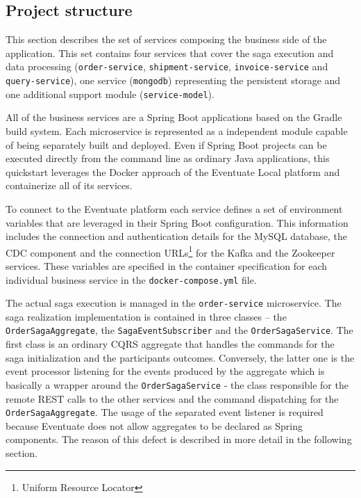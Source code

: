 \documentclass[oneside,
  digital, %
  table,   %
  nolof,     %
  nolot,     %
]{fithesis3}
\begin{document}
\subsection{Project structure}

This section describes the set of services composing the business side of the application. This set contains four services that cover the saga execution and data processing (\texttt{order-service}, \texttt{shipment-service}, \texttt{invoice-service} and \texttt{query-service}), one service (\texttt{mongodb}) representing the persistent storage and one additional support module (\texttt{service-model}).

All of the business services are a Spring Boot applications based on the Gradle \cite{gradle} build system. Each microservice is represented as a independent module capable of being separately built and deployed. Even if Spring Boot projects can be executed directly from the command line as ordinary Java applications, this quickstart leverages the Docker approach of the Eventuate Local platform and containerize all of its services.

To connect to the Eventuate platform each service defines a set of environment variables that are leveraged in their Spring Boot configuration. This information includes the connection and authentication details for the MySQL database, the CDC component and the connection URLs\footnote{Uniform Resource Locator} for the Kafka and the Zookeeper services. These variables are specified in the container specification for each individual business service in the \texttt{docker-compose.yml} file.

The actual saga execution is managed in the \texttt{order-service} microservice. The saga realization implementation is contained in three classes -- the \texttt{OrderSagaAggregate}, the \texttt{SagaEventSubscriber} and the \texttt{OrderSagaService}. The first class is an ordinary CQRS aggregate that handles the commands for the saga initialization and the participants outcomes. Conversely, the latter one is the event processor listening for the events produced by the aggregate which is basically a wrapper around the \texttt{OrderSagaService} - the class responsible for the remote REST calls to the other services and the command dispatching for the \texttt{OrderSagaAggregate}. The usage of the separated event listener is required because Eventuate does not allow aggregates to be declared as Spring components. The reason of this defect is described in more detail in the following section.
\end{document}
